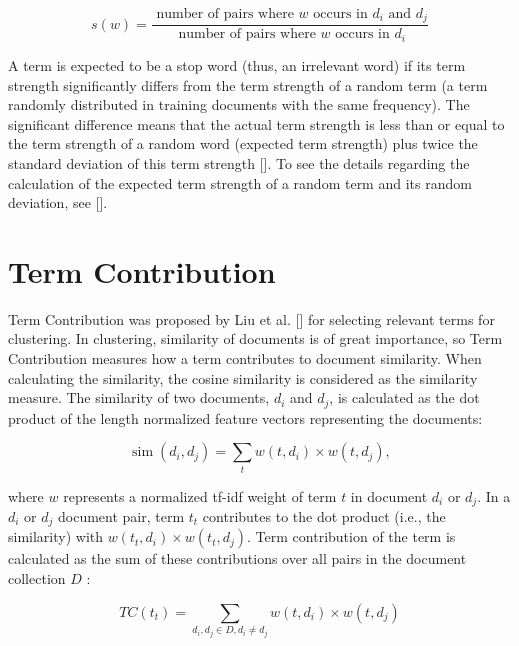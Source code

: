 \begin{equation*}
s(w)=\frac{\text { number of pairs where } w \text { occurs in } d_{i} \text { and } d_{j}}{\text { number of pairs where } w \text { occurs in } d_{i}} \tag{14.22}
\end{equation*}


A term is expected to be a stop word (thus, an irrelevant word) if its term strength significantly differs from the term strength of a random term (a term randomly distributed in training documents with the same frequency). The significant difference means that the actual term strength is less than or equal to the term strength of a random word (expected term strength) plus twice the standard deviation of this term strength [\cite{ref7}]. To see the details regarding the calculation of the expected term strength of a random term and its random deviation, see [\cite{ref278}].


\section{Term Contribution}
Term Contribution was proposed by Liu et al. [\cite{ref179}] for selecting relevant terms for clustering. In clustering, similarity of documents is of great importance, so Term Contribution measures how a term contributes to document similarity. When calculating the similarity, the cosine similarity is considered as the similarity measure. The similarity of two documents, $d_{i}$ and $d_{j}$, is calculated as the dot product of the length normalized feature vectors representing the documents:


\begin{equation*}
\operatorname{sim}\left(d_{i}, d_{j}\right)=\sum_{t} w\left(t, d_{i}\right) \times w\left(t, d_{j}\right), \tag{14.23}
\end{equation*}


where $w$ represents a normalized tf-idf weight of term $t$ in document $d_{i}$ or $d_{j}$. In a $d_{i}$ or $d_{j}$ document pair, term $t_{t}$ contributes to the dot product (i.e., the similarity) with $w\left(t_{t}, d_{i}\right) \times w\left(t_{t}, d_{j}\right)$. Term contribution of the term is calculated as the sum of these contributions over all pairs in the document collection $D$ :


\begin{equation*}
T C\left(t_{t}\right)=\sum_{d_{i}, d_{j} \in D, d_{i} \neq d_{j}} w\left(t, d_{i}\right) \times w\left(t, d_{j}\right) \tag{14.24}
\end{equation*}


